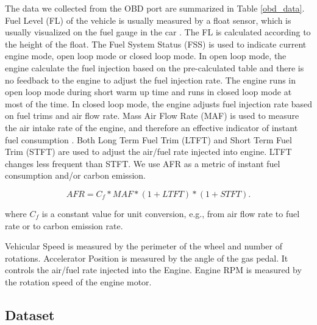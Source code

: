 The data we collected from the OBD port are summarized in Table \ref{obd_data}. 
Fuel Level (FL) of the vehicle is usually measured by a float sensor, 
which is usually visualized on the fuel gauge in the car \cite{fuel-gauge}.
The FL is calculated according to the height of the float. 
The Fuel System Status (FSS) is used to indicate current engine mode, 
open loop mode or closed loop mode. 
In open loop mode, 
the engine calculate the fuel injection based on the pre-calculated
table and there is no feedback to the engine to adjust the fuel injection rate. 
The engine runs in open loop mode during short warm up time
and runs in closed loop mode at most of the time. 
In closed loop mode, the engine adjusts fuel injection rate based on
fuel trims and air flow rate. 
Mass Air Flow Rate (MAF) is used to measure the air intake rate of the engine, 
and therefore an effective indicator of instant fuel consumption 
\cite{alessandrini2012consumption, lee2011estimation, koukoumidis2011signalguru}. 
Both Long Term Fuel Trim (LTFT) and Short Term Fuel Trim (STFT) are used to 
adjust the air/fuel rate injected into engine. 
LTFT changes less frequent than STFT. 
We use AFR as a metric of 
instant fuel consumption and/or carbon emission. 


\begin{equation}
AFR = C_f * MAF * (1 + LTFT) * (1 + STFT).
\end{equation}

where $C_f$ is a constant value for unit conversion, e.g., from air flow rate to
fuel rate or to carbon emission rate. 

Vehicular Speed is measured by the perimeter of the wheel and 
number of rotations. 
Accelerator Position is measured by the angle of the gas pedal.
It controls the air/fuel rate injected into the Engine.  
Engine RPM is measured by the rotation speed of the engine motor. 


\subsection{Dataset}



